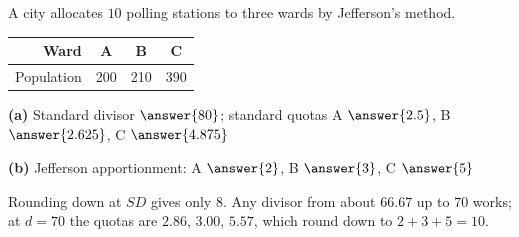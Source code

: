 \documentclass[12pt]{ximera}
\begin{document}
\begin{problem}
A city allocates $10$ polling stations to three wards by Jefferson's method.
\begin{center}
\begin{tabular}{r|ccc}
Ward & A & B & C\\\hline
Population & 200 & 210 & 390
\end{tabular}
\end{center}

\begin{prompt}
\textbf{(a)} Standard divisor $\answer{80}$; standard quotas A $\answer{2.5}$,
B $\answer{2.625}$, C $\answer{4.875}$
\end{prompt}

\begin{prompt}
\textbf{(b)} Jefferson apportionment: A $\answer{2}$, B $\answer{3}$, C $\answer{5}$
\begin{feedback}
Rounding down at $SD$ gives only $8$. Any divisor from about $66.67$ up to $70$ works;
at $d=70$ the quotas are $2.86$, $3.00$, $5.57$, which round down to $2+3+5=10$.
\end{feedback}
\end{prompt}
\end{problem}
\end{document}
